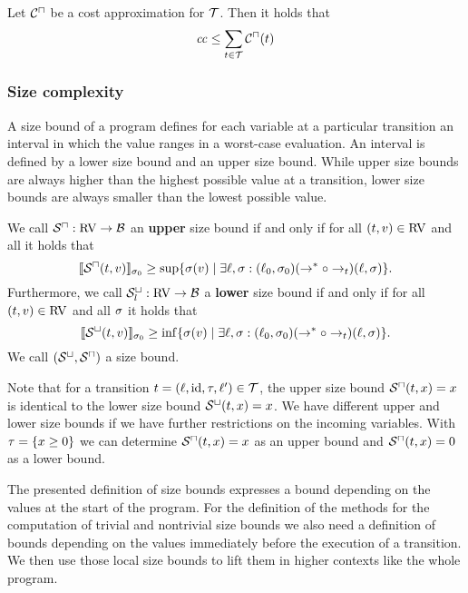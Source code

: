 \begin{theorem}
	Let ${\mathcal{C}^\sqcap}$ be a cost approximation for $\mathcal{T}$.
	Then it holds that 
	\[ \mathit{cc} \leq \sum_{t \in \mathcal{T}} {\mathcal{C}^\sqcap}(t) \]
\end{theorem}

\subsubsection{Size complexity}

A size bound of a program defines for each variable at a particular transition an interval in which the value ranges in a worst-case evaluation.
An interval is defined by a lower size bound and an upper size bound.
While upper size bounds are always higher than the highest possible value at a transition, lower size bounds are always smaller than the lowest possible value.

\begin{definition}
  We call ${\mathcal{S}^\sqcap}: \text{RV} \rightarrow \mathcal{B}$ an \textbf{upper} size bound if and only if for all $(t, v) \in \text{RV}$ and all  it holds that
  \[ \llbracket {\mathcal{S}^\sqcap}(t, v) \rrbracket_{\sigma_0} \geq \sup \lbrace \sigma(v) \mid \exists \ell, \sigma: (\ell_0, \sigma_0) (\rightarrow^* \circ \rightarrow_t) (\ell, \sigma) \rbrace. \]
  Furthermore, we call ${\mathcal{S}^\sqcup_l}: \text{RV} \rightarrow \mathcal{B}$ a \textbf{lower} size bound if and only if for all $(t, v) \in \text{RV}$ and all $\sigma$ it holds that
  \[ \llbracket {\mathcal{S}^\sqcup}(t, v) \rrbracket_{\sigma_0} \geq \inf \lbrace \sigma(v) \mid \exists \ell, \sigma: (\ell_0, \sigma_0) (\rightarrow^* \circ \rightarrow_t) (\ell, \sigma) \rbrace. \]
  We call ${({\mathcal{S}^\sqcup}, {\mathcal{S}^\sqcap})}$ a size bound.
\end{definition}

Note that for a transition $t = (\ell,\text{id},\tau,\ell') \in \mathcal{T}$, the upper size bound ${\mathcal{S}^\sqcap}(t,x) = x$ is identical to the lower size bound ${\mathcal{S}^\sqcup}(t,x) = x$.
We have different upper and lower size bounds if we have further restrictions on the incoming variables.
With $\tau = \lbrace x \geq 0 \rbrace$ we can determine ${\mathcal{S}^\sqcap}(t,x) = x$ as an upper bound and ${\mathcal{S}^\sqcap}(t,x) = 0$ as a lower bound.

The presented definition of size bounds expresses a bound depending on the values at the start of the program.
For the definition of the methods for the computation of trivial and nontrivial size bounds we also need a definition of bounds depending on the values immediately before the execution of a transition.
We then use those local size bounds to lift them in higher contexts like the whole program.

